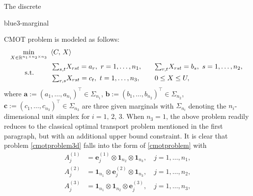 \documentclass[10pt]{article}
\newcommand{\blue}[1]{\begin{color}{blue}#1\end{color}}
\begin{document}
The discrete \blue{3-marginal} CMOT problem is modeled as follows:
\begin{equation}\label{cmotproblem3d}
\begin{aligned}
&\min\limits_{X\in\mathbb{R}^{n_1 \times n_2 \times n_3}}\,\,\,
 \langle C, \,X\rangle \\
&\hspace{0.8cm} \mathrm{s.t.} \hspace{0.4cm}
\begin{array}{lll}
&{\textstyle\sum_{s,t}}X_{rst} = a_r, ~r = 1, \dots, n_1, \quad
&{\textstyle\sum_{r,t}}X_{rst} = b_s, ~s = 1, \dots, n_2, \\[5pt]
&{\textstyle\sum_{r,s}}X_{rst} = c_t, ~t = 1, \dots, n_3, \quad
&0 \leq X \leq U,
\end{array}
\end{aligned}
\end{equation}
where $\bm{a}:=(a_1, \dots, a_{n_1})^{\top}\in\Sigma_{n_1}$, $\bm{b}:=(b_1, \dots, b_{n_2})^{\top}\in\Sigma_{n_2}$, $\bm{c}:=(c_1, \dots, c_{n_3})^{\top}\in\Sigma_{n_3}$ are three given marginals with $\Sigma_{n_i}$ denoting the $n_i$-dimensional unit simplex for $i=1, \,2, \,3$. When $n_3=1$, the above problem readily reduces to the classical optimal transport problem mentioned in the first paragraph, but with an additional upper bound constraint. It is clear that problem \eqref{cmotproblem3d} falls into the form of \eqref{cmotproblem} with
\begin{equation}\label{eq-specialAj}
\begin{aligned}
A^{(1)}_{j} &= \bm{e}_j^{(1)} \otimes \bm{1}_{n_2} \otimes \bm{1}_{n_3}, \quad j=1,\dots,n_1, \\
A^{(2)}_{j} &= \bm{1}_{n_1} \otimes \bm{e}_j^{(2)} \otimes \bm{1}_{n_3}, \quad j=1,\dots,n_2, \\
A^{(3)}_{j} &= \bm{1}_{n_1} \otimes \bm{1}_{n_2} \otimes \bm{e}_j^{(3)}, \quad j=1,\dots,n_3,
\end{aligned}
\end{equation}
\end{document}

